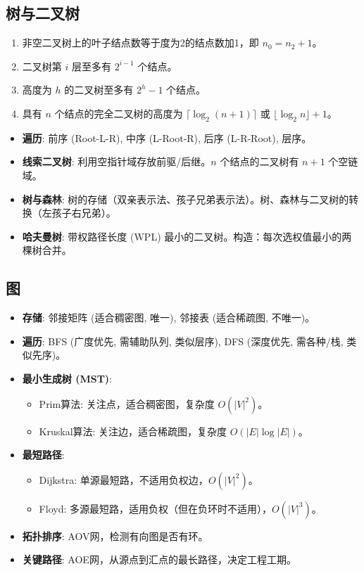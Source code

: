 \documentclass[cn,hazy,blue,12pt,screen,normal]{elegantnote}
\begin{document}
\subsection{树与二叉树}
\begin{theorem}[二叉树性质]
\begin{enumerate}
    \item 非空二叉树上的叶子结点数等于度为2的结点数加1，即 $n_0 = n_2 + 1$。
    \item 二叉树第 $i$ 层至多有 $2^{i-1}$ 个结点。
    \item 高度为 $h$ 的二叉树至多有 $2^h - 1$ 个结点。
    \item 具有 $n$ 个结点的完全二叉树的高度为 $\lceil \log_2(n+1) \rceil$ 或 $\lfloor \log_2 n \rfloor + 1$。
\end{enumerate}
\end{theorem}
\begin{itemize}
    \item \textbf{遍历}: 前序 (Root-L-R), 中序 (L-Root-R), 后序 (L-R-Root), 层序。
    \item \textbf{线索二叉树}: 利用空指针域存放前驱/后继。$n$ 个结点的二叉树有 $n+1$ 个空链域。
    \item \textbf{树与森林}: 树的存储（双亲表示法、孩子兄弟表示法）。树、森林与二叉树的转换（左孩子右兄弟）。
    \item \textbf{哈夫曼树}: 带权路径长度 (WPL) 最小的二叉树。构造：每次选权值最小的两棵树合并。
\end{itemize}

\subsection{图}
\begin{itemize}
    \item \textbf{存储}: 邻接矩阵 (适合稠密图, 唯一), 邻接表 (适合稀疏图, 不唯一)。
    \item \textbf{遍历}: BFS (广度优先, 需辅助队列, 类似层序), DFS (深度优先, 需各种/栈, 类似先序)。
    \item \textbf{最小生成树 (MST)}:
    \begin{itemize}
         \item Prim算法: 关注点，适合稠密图，复杂度 $O(|V|^2)$。
         \item Kruskal算法: 关注边，适合稀疏图，复杂度 $O(|E|\log|E|)$。
    \end{itemize}
    \item \textbf{最短路径}:
    \begin{itemize}
         \item Dijkstra: 单源最短路，不适用负权边，$O(|V|^2)$。
         \item Floyd: 多源最短路，适用负权（但在负环时不适用），$O(|V|^3)$。
    \end{itemize}
    \item \textbf{拓扑排序}: AOV网，检测有向图是否有环。
    \item \textbf{关键路径}: AOE网，从源点到汇点的最长路径，决定工程工期。
\end{itemize}
\end{document}
